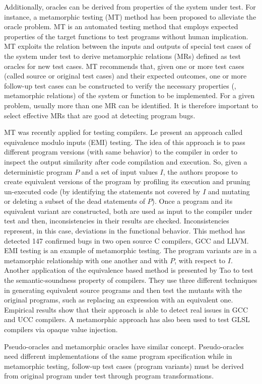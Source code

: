 \begin{itemize}
	Additionally, oracles can be derived from properties of the system under test. For instance, a metamorphic testing (MT) method has been proposed to alleviate the oracle problem\cite{chen2004case}. MT is an automated testing method that employs expected properties of the target functions to test programs without human implication. 
	MT exploits the relation between the inputs and outputs of special test cases of the system under test to derive metamorphic relations (MRs) defined as test oracles for new test cases. 
	MT recommends that, given one or more test cases (called source or original test cases) and their expected outcomes, one or more follow-up test cases can be constructed to verify the necessary properties (\ie, metamorphic relations) of the system or function to be implemented.
	For a given problem, usually more than one MR can be identified. It is therefore important to select effective MRs that are good at detecting program bugs.

	MT was recently applied for testing compilers. Le \etal\cite{le2014compiler} present an approach called equivalence modulo inputs (EMI) testing. The idea of this approach is to pass different program versions (with same behavior) to the compiler in order to inspect the output similarity after code compilation and execution. So, given a deterministic program $P$ and a set of input values $I$, the authors propose to create equivalent versions of the program by profiling its execution and pruning un-executed code (by identifying the statements not covered by $I$ and mutating or deleting a subset of the dead statements of $P$).
	Once a program and its equivalent variant are constructed, both are used as input to the compiler under test and then, inconsistencies in their results are checked. Inconsistencies represent, in this case, deviations in the functional behavior.
	This method has detected \num{147} confirmed bugs in two open source C compilers, GCC and LLVM.
	EMI testing is an example of metamorphic testing. The program variants are in a metamorphic relationship with one another and with $P$, with respect to $I$.
	Another application of the equivalence based method is presented by Tao \etal\cite{tao2010automatic} to test the semantic-soundness property of compilers. They use three different techniques in generating equivalent source programs and then test the mutants with the original programs, such as replacing an expression with an equivalent one. Empirical results show that their approach is able to detect real issues in GCC and UCC compilers.
	A metamorphic approach has also been used to test GLSL compilers via opaque value injection\cite{donaldson2016metamorphic}.
	
	Pseudo-oracles and metamorphic oracles have similar concept. Pseudo-oracles need different implementations of the same program specification while in metamorphic testing, follow-up test cases (program variants) must be derived from original program under test through program transformations.
	

	
	
\end{itemize}



